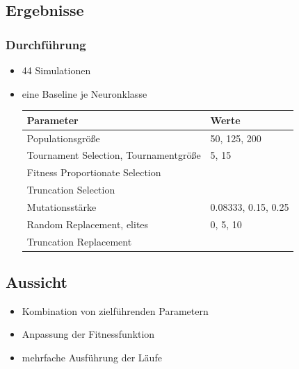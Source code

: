 \subsection{Ergebnisse}

\begin{frame}
  \frametitle{Durchführung}
  \begin{itemize}
  \item 44 Simulationen
  \item eine Baseline je Neuronklasse
    \scriptsize
    \begin{tabular}[H]{ll}
      Parameter & Werte \\\hline
      Populationsgröße & 50, 125, 200 \\ \arrayrulecolor{light-gray}\hline
      Tournament Selection, Tournamentgröße & 5, 15 \\
      Fitness Proportionate Selection & \\
      Truncation Selection  & \\ \hline
      Mutationsstärke & 0.08333, 0.15, 0.25 \\ \hline
      Random Replacement, elites & 0, 5, 10 \\
      Truncation Replacement & \\
    \end{tabular}
  \end{itemize}
\end{frame}


\begin{frame}
  
\end{frame}

\subsection{Aussicht}

\begin{frame}
  \begin{itemize}
  \item Kombination von zielführenden Parametern
  \item Anpassung der Fitnessfunktion
  \item mehrfache Ausführung der Läufe
  \end{itemize}
\end{frame}